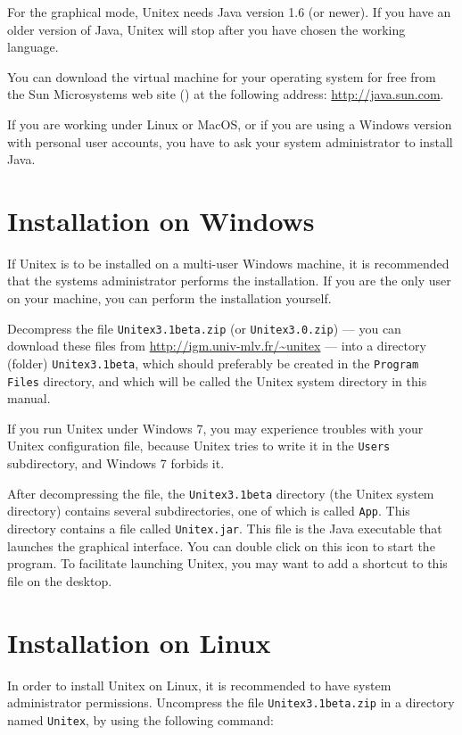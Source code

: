 \bigskip
\noindent For the graphical mode, Unitex needs Java version 1.6 (or newer). If you have an
older version of Java, Unitex will stop after you have chosen the working
language.

\bigskip
\noindent You can download the virtual machine for your operating system for free from the
Sun Microsystems web site (\cite{site-java}) at the following address:
\url{http://java.sun.com}.

\bigskip
\noindent If you are working under Linux or MacOS, or if you are using a Windows version
with personal user accounts, you have to ask your system administrator to install
Java.


\section{Installation on Windows}
If Unitex is to be installed on a multi-user Windows machine, it is recommended
that the systems administrator performs the installation. If you are the only
user on your machine, you can perform the installation  yourself.

\bigskip
\noindent Decompress the file  \verb+Unitex3.1beta.zip+
(or \verb+Unitex3.0.zip+) --- you
can download these files from
\url{http://igm.univ-mlv.fr/~unitex} --- into a directory (folder) \verb+Unitex3.1beta+, which
should preferably be created in the \verb+Program Files+ directory,
and which will be called the Unitex system directory
in this manual.

\bigskip
\noindent If you run Unitex under Windows 7, you may experience troubles with your Unitex configuration
file, because Unitex tries to write it in the \verb+Users+ subdirectory, and Windows 7
forbids it.

\bigskip
\noindent After decompressing the file, the \verb+Unitex3.1beta+ directory
(the Unitex system directory) contains several
subdirectories,  one  of which is called \verb+App+. This directory contains a
file called \verb+Unitex.jar+.  This file is the
Java executable that launches the graphical interface. You can double click on
this icon to start the program. To facilitate launching Unitex, you may want to
add a shortcut to this file on the desktop.




\section{Installation on Linux}
In order to install Unitex on Linux, it is recommended to have system
administrator permissions. Uncompress the file \verb+Unitex3.1beta.zip+ in a
directory named \verb+Unitex+, by using the following command:

